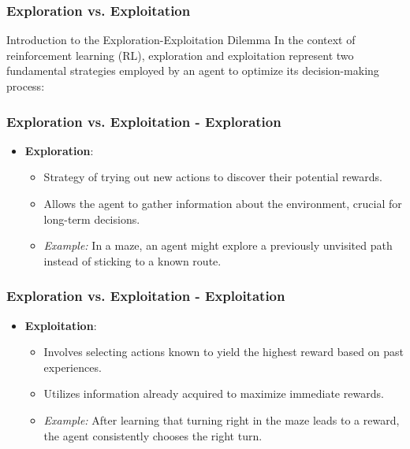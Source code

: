 \documentclass{beamer}
\begin{document}
\begin{frame}[fragile]
    \frametitle{Exploration vs. Exploitation}
    \begin{block}{Introduction to the Exploration-Exploitation Dilemma}
        In the context of reinforcement learning (RL), exploration and exploitation represent two fundamental strategies employed by an agent to optimize its decision-making process:
    \end{block}
\end{frame}

\begin{frame}[fragile]
    \frametitle{Exploration vs. Exploitation - Exploration}
    \begin{itemize}
        \item \textbf{Exploration}:
            \begin{itemize}
                \item Strategy of trying out new actions to discover their potential rewards.
                \item Allows the agent to gather information about the environment, crucial for long-term decisions.
                \item \textit{Example:} In a maze, an agent might explore a previously unvisited path instead of sticking to a known route.
            \end{itemize}
    \end{itemize}
\end{frame}

\begin{frame}[fragile]
    \frametitle{Exploration vs. Exploitation - Exploitation}
    \begin{itemize}
        \item \textbf{Exploitation}:
            \begin{itemize}
                \item Involves selecting actions known to yield the highest reward based on past experiences.
                \item Utilizes information already acquired to maximize immediate rewards.
                \item \textit{Example:} After learning that turning right in the maze leads to a reward, the agent consistently chooses the right turn.
            \end{itemize}
    \end{itemize}
\end{frame}
\end{document}

